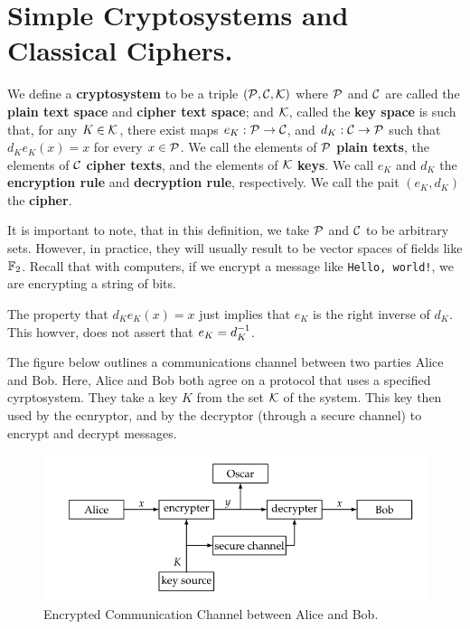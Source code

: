 
\section{Simple Cryptosystems and Classical Ciphers.}
\label{section1}

\begin{definition}
    We define a \textbf{cryptosystem} to be a triple $(\mathcal{P}, \mathcal{C}, \mathcal{K})$ where
    $\mathcal{P}$ and  $\mathcal{C}$ are called the \textbf{plain text space} and
    \textbf{cipher text space}; and $\mathcal{K}$, called the \textbf{key space} is such
    that, for any $K \in \mathcal{K}$, there exist maps $e_K:\mathcal{P} \rightarrow \mathcal{C}$, and
    $d_K:\mathcal{C} \rightarrow \mathcal{P}$ such that $d_Ke_K(x)=x$ for every $x \in \mathcal{P}$. We
    call the elements of  $\mathcal{P}$ \textbf{plain texts}, the elements of $\mathcal{C}$
     \textbf{cipher texts}, and the elements of $\mathcal{K}$  \textbf{keys}. We call
     $e_K$ and  $d_K$ the  \textbf{encryption rule} and \textbf{decryption
     rule}, respectively. We call the pait $(e_K,d_K)$ the \textbf{cipher}.
\end{definition}
\begin{remark}
    It is important to note, that in this definition, we take $\mathcal{P}$ and $\mathcal{C}$ to
    be arbitrary sets. However, in practice, they will usually result to be
    vector spaces of fields like  $\mathbb{F}_2$. Recall that with computers, if we
    encrypt a message like \lstinline{Hello, world!}, we are encrypting a string
    of bits.
\end{remark}
\begin{remark}
    The property that $d_Ke_K(x)=x$ just implies that $e_K$ is the right inverse
    of  $d_K$. This howver, does not assert that  $e_K=d_K^{-1}$.
\end{remark}

The figure below outlines a communications channel between two parties Alice and
Bob. Here, Alice and Bob both agree on a protocol that uses a specified
cyrptosystem. They take a key $K$ from the set  $\mathcal{K}$ of the system. This key
then used by the ecnryptor, and by the decryptor  (through a secure channel) to
encrypt and decrypt messages.

\begin{figure}
    \centering
    \includegraphics[scale = 0.5]{Figures/Chapter1/encrypt_comm_channel.png}
    \caption{Encrypted Communication Channel between Alice and Bob.}
    \label{fig_1.1}
\end{figure}


